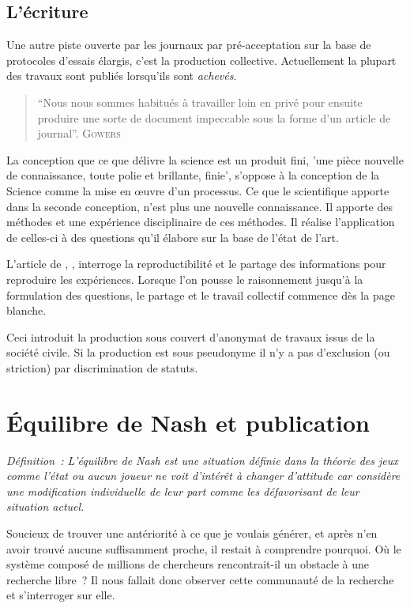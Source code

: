 \subsection{L'écriture}
Une autre piste ouverte par les journaux par pré-acceptation sur la base de protocoles d'essais élargis, c'est la production collective.
Actuellement la plupart des travaux sont publiés lorsqu'ils sont \emph{achevés}.

\blockcquote{belluz_7_2016}{
``Nous nous sommes habitués à travailler loin en privé pour ensuite produire une sorte de document impeccable sous la forme d'un article de journal''. \textsc{Gowers}
}

La conception que ce que délivre la science est un produit fini, 'une pièce nouvelle de connaissance, toute polie et brillante, finie', s'oppose à la conception de la Science comme la mise en œuvre d'un processus.
Ce que le scientifique apporte dans la seconde conception, n'est plus une nouvelle connaissance.
Il apporte des méthodes et une expérience disciplinaire de ces méthodes.
Il réalise l'application de celles-ci à des questions qu'il élabore sur la base de l'état de l'art.

L'article de \citeauthor{belluz_7_2016}, , interroge la reproductibilité et le partage des informations pour reproduire les expériences.
Lorsque l'on pousse le raisonnement jusqu'à la formulation des questions, le partage et le travail collectif commence dès la page blanche.

Ceci introduit la production sous couvert d'anonymat de travaux issus de la société civile.
Si la production est sous pseudonyme il n'y a pas d'exclusion (ou striction) par discrimination de statuts.

\section{Équilibre de Nash et publication}
\textit{Définition~: L'équilibre de Nash est une situation définie dans la théorie des jeux comme l'état ou aucun joueur ne voit d’intérêt à changer d'attitude car considère une modification individuelle de leur part comme les défavorisant de leur situation actuel.}

Soucieux de trouver une antériorité à ce que je voulais générer, et après n'en avoir trouvé aucune suffisamment proche, il restait à comprendre pourquoi.
Où le système composé de millions de chercheurs rencontrait-il un obstacle à une recherche libre~?
Il nous fallait donc observer cette communauté de la recherche et s’interroger sur elle.

